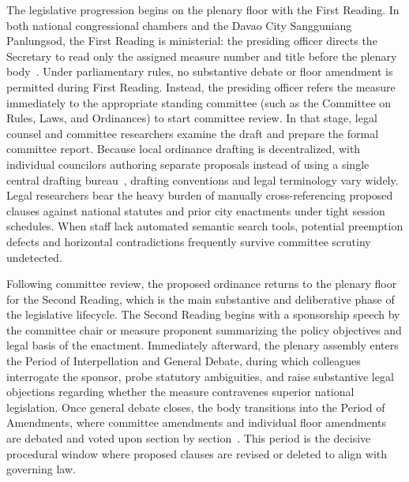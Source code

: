     The legislative progression begins on the plenary floor with the First Reading. In both national congressional chambers and the Davao City Sangguniang Panlungsod, the First Reading is ministerial: the presiding officer directs the Secretary to read only the assigned measure number and title before the plenary body~\cite{philhouse2022rules, spdc2022ra00122}. Under parliamentary rules, no substantive debate or floor amendment is permitted during First Reading. Instead, the presiding officer refers the measure immediately to the appropriate standing committee (such as the Committee on Rules, Laws, and Ordinances) to start committee review. In that stage, legal counsel and committee researchers examine the draft and prepare the formal committee report. Because local ordinance drafting is decentralized, with individual councilors authoring separate proposals instead of using a single central drafting bureau~\cite{philgov1991ra7160, spdc2022ra00122}, drafting conventions and legal terminology vary widely. Legal researchers bear the heavy burden of manually cross-referencing proposed clauses against national statutes and prior city enactments under tight session schedules. When staff lack automated semantic search tools, potential preemption defects and horizontal contradictions frequently survive committee scrutiny undetected.

    Following committee review, the proposed ordinance returns to the plenary floor for the Second Reading, which is the main substantive and deliberative phase of the legislative lifecycle. The Second Reading begins with a sponsorship speech by the committee chair or measure proponent summarizing the policy objectives and legal basis of the enactment. Immediately afterward, the plenary assembly enters the Period of Interpellation and General Debate, during which colleagues interrogate the sponsor, probe statutory ambiguities, and raise substantive legal objections regarding whether the measure contravenes superior national legislation. Once general debate closes, the body transitions into the Period of Amendments, where committee amendments and individual floor amendments are debated and voted upon section by section~\cite{philhouse2022rules, spdc2022ra00122}. This period is the decisive procedural window where proposed clauses are revised or deleted to align with governing law.


